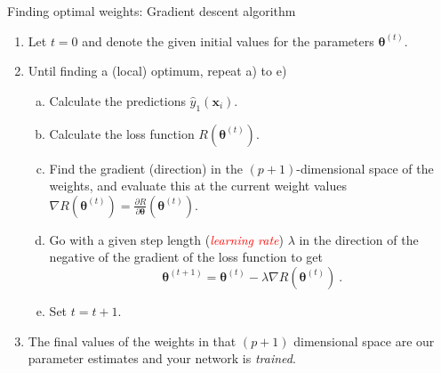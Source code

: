 \documentclass[
  10pt,
  ignorenonframetext,
  twocolumn]{beamer}
\providecommand{\tightlist}{%
  \setlength{\itemsep}{0pt}\setlength{\parskip}{0pt}}
\begin{document}
\begin{frame}
\begin{block}{Finding optimal weights: Gradient descent algorithm}
\label{finding-optimal-weights-gradient-descent-algorithm}
\vspace{2mm}

\begin{enumerate}
\tightlist
\item
  Let \(t=0\) and denote the given initial values for the parameters
  \({\boldsymbol \theta}^{(t)}\). \vspace{2mm}
\item
  Until finding a (local) optimum, repeat a) to e)

  \begin{enumerate}
  [a)]
  \tightlist
  \item
    Calculate the predictions \({\hat{y}_1({\boldsymbol x}_i)}\).
  \item
    Calculate the loss function \(R({\boldsymbol \theta}^{(t)})\).
  \item
    Find the gradient (direction) in the \((p+1)\)-dimensional space of
    the weights, and evaluate this at the current weight values
    \(\nabla R({\boldsymbol \theta}^{(t)})={\frac{\partial R}{\partial {\boldsymbol \theta}}}({\boldsymbol \theta}^{(t)})\).
  \item
    Go with a given step length (\emph{\textcolor{red}{learning rate}})
    \(\lambda\) in the direction of the negative of the gradient of the
    loss function to get
    \[{\boldsymbol \theta}^{(t+1)}={\boldsymbol \theta}^{(t)} - \lambda \nabla R({\boldsymbol \theta}^{(t)}) \ .\]
  \item
    Set \(t=t+1\). \vspace{2mm}
  \end{enumerate}
\item
  The final values of the weights in that \((p+1)\) dimensional space
  are our parameter estimates and your network is \emph{trained}.
\end{enumerate}
\end{block}
\end{frame}
\end{document}
